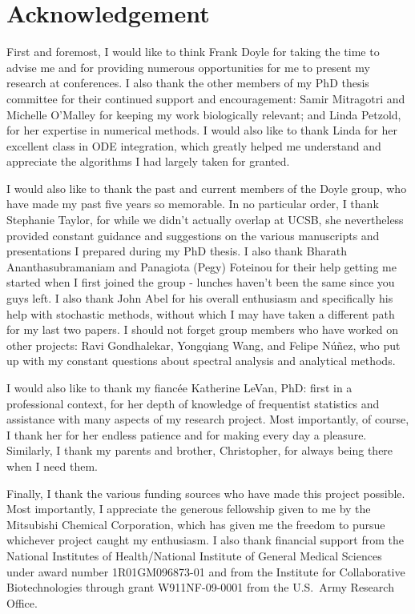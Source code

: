 \chapter*{Acknowledgement}

First and foremost, I would like to think Frank Doyle for taking the time to advise me and for providing numerous opportunities for me to present my research at conferences.
I also thank the other members of my PhD thesis committee for their continued support and encouragement: Samir Mitragotri and Michelle O'Malley for keeping my work biologically relevant; and Linda Petzold, for her expertise in numerical methods.
I would also like to thank Linda for her excellent class in ODE integration, which greatly helped me understand and appreciate the algorithms I had largely taken for granted.

I would also like to thank the past and current members of the Doyle group, who have made my past five years so memorable.
In no particular order, I thank Stephanie Taylor, for while we didn't actually overlap at UCSB, she nevertheless provided constant guidance and suggestions on the various manuscripts and presentations I prepared during my PhD thesis.
I also thank Bharath Ananthasubramaniam and Panagiota (Pegy) Foteinou for their help getting me started when I first joined the group - lunches haven't been the same since you guys left.
I also thank John Abel for his overall enthusiasm and specifically his help with stochastic methods, without which I may have taken a different path for my last two papers.
I should not forget group members who have worked on other projects: Ravi Gondhalekar, Yongqiang Wang, and Felipe N\'{u}\~{n}ez, who put up with my constant questions about spectral analysis and analytical methods.

I would also like to thank my fianc\'{e}e Katherine LeVan, PhD: first in a professional context, for her depth of knowledge of frequentist statistics and assistance with many aspects of my research project.
Most importantly, of course, I thank her for her endless patience and for making every day a pleasure.
Similarly, I thank my parents and brother, Christopher, for always being there when I need them.

Finally, I thank the various funding sources who have made this project possible.
Most importantly, I appreciate the generous fellowship given to me by the Mitsubishi Chemical Corporation, which has given me the freedom to pursue whichever project caught my enthusiasm.
I also thank financial support from the National Institutes of Health/National Institute of General Medical Sciences under award number 1R01GM096873-01 and from the Institute for Collaborative Biotechnologies through grant W911NF-09-0001 from the U.S.\ Army Research Office.



